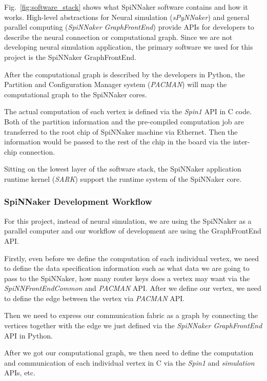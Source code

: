 Fig.~\ref{fig:software_stack} shows what SpiNNaker software contains and how it works. High-level abstractions for Neural simulation (\textit{sPyNNaker}) and general parallel computing (\textit{SpiNNaker GraphFrontEnd}) provide APIs for developers to describe the neural connection or computational graph. Since we are not developing neural simulation application, the primary software we used for this project is the SpiNNaker GraphFrontEnd. 

After the computational graph is described by the developers in Python, the Partition and Configuration Manager system (\textit{PACMAN}) will map the computational graph to the SpiNNaker cores. 

The actual computation of each vertex is defined via the \textit{Spin1} API in C code. Both of the partition information and the pre-compiled computation job are transferred to the root chip of SpiNNaker machine via Ethernet. Then the information would be passed to the rest of the chip in the board via  the inter-chip connection.


Sitting on the lowest layer of the software stack, the SpiNNaker application runtime kernel (\textit{SARK}) support the runtime system of the SpiNNaker core. 


\subsubsection{SpiNNaker Development Workflow} \label{sec:sdw}

For this project, instead of neural simulation, we are using the SpiNNaker as a parallel computer and our workflow of development are using the GraphFrontEnd API.

Firstly, even before we define the computation of each individual vertex, we need to define the data specification information such as what data we are going to pass to the SpiNNaker, how many router keys does a vertex may want via the \textit{SpiNNFrontEndCommon} and \textit{PACMAN} API. After we define our vertex, we need to define the edge between the vertex via \textit{PACMAN} API.

Then we need to express our communication fabric as a graph by connecting the vertices together with the edge we just defined via the \textit{SpiNNaker GraphFrontEnd} API in Python. 

After we got our computational graph, we then need to define the computation and communication of each individual vertex in C via the \textit{Spin1} and \textit{simulation} APIs, etc.

